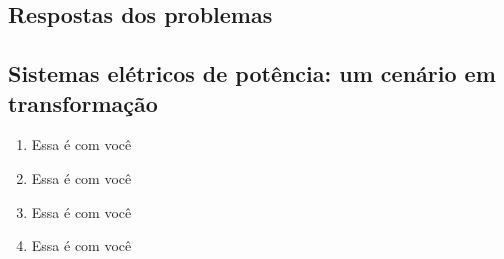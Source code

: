 \documentclass[
	12pt,				        %
	openright,			    %
	twoside,			      %
	a4paper,			      %
	chapter=TITLE,		  %
	section=TITLE,		  %
	subsection=TITLE,	  %
	subsubsection=TITLE,%
	english,			      %
	french,				      %
	brazil,				      %
	sumario=tradicional
]{abntex2}
\begin{document}
\begin{apendicesenv}

\partapendices

\chapter{Respostas dos problemas}

\section*{Sistemas elétricos de potência: um cenário em transformação}

\begin{multicols}{2}
\begin{enumerate}[label=\arabic*.,start=1]

	\item Essa é com você

	\item Essa é com você
	
	\item Essa é com você
	
	\item Essa é com você
	
	
\end{enumerate}
\end{multicols}

\end{apendicesenv}

\cleardoublepage
\thispagestyle{empty} 
\end{document}
